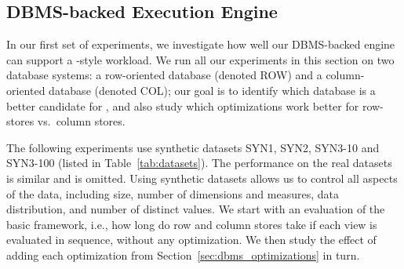 \subsection{DBMS-backed Execution Engine}
\label{sec:expts_dbms_execution_engine}

In our first set of experiments, we investigate 
how well our DBMS-backed engine
can support a \VizRecDB-style workload.
We run all our experiments in this section on two database systems: a
row-oriented database (denoted ROW) and a
column-oriented database (denoted COL);
our goal is to identify which database is a better
candidate for \VizRecDB, and also study which optimizations
work better for row-stores vs.~column stores. 

The following experiments use synthetic datasets SYN1, SYN2, SYN3-10 and
SYN3-100 (listed in Table~\ref{tab:datasets}).
The performance on the real datasets is similar and is omitted.
Using synthetic datasets allows us to control all aspects
of the data, including size, number of dimensions and measures, 
data distribution, and number of distinct values. 
We start with an evaluation of the basic framework, i.e., 
how long do row and column stores take if each view is evaluated 
in sequence, without any optimization. 
We then study the effect of adding each optimization from Section~\ref{sec:dbms_optimizations} 
in turn.


